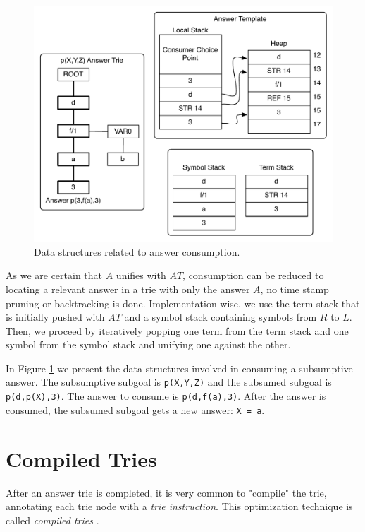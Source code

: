 \begin{figure}[H]
  \centering
    \includegraphics[scale=0.6]{consume_answer.pdf}
  \caption{Data structures related to answer consumption.}
  \label{fig:consume_answer}
\end{figure}

As we are certain that $A$ unifies with $AT$, consumption can be reduced to locating a relevant
answer in a trie with only the answer $A$, no time stamp pruning or backtracking is done.
Implementation wise, we use the term stack that is initially pushed with $AT$
and a symbol stack containing symbols from $R$ to $L$. Then, we proceed by
iteratively popping one term from the term stack and one symbol from the symbol stack
and unifying one against the other.

In Figure \ref{fig:consume_answer} we present the data structures involved in consuming
a subsumptive answer. The subsumptive subgoal is \texttt{p(X,Y,Z)} and the
subsumed subgoal is \texttt{p(d,p(X),3)}. The answer to consume is \texttt{p(d,f(a),3)}.
After the answer is consumed, the subsumed subgoal gets a new answer: \texttt{X = a}.

\section{Compiled Tries}

After an answer trie is completed, it is very common to "compile" the trie,
annotating each trie node with a \textit{trie instruction}. This optimization technique
is called \textit{compiled tries} \cite{RamakrishnanIV-99}.

